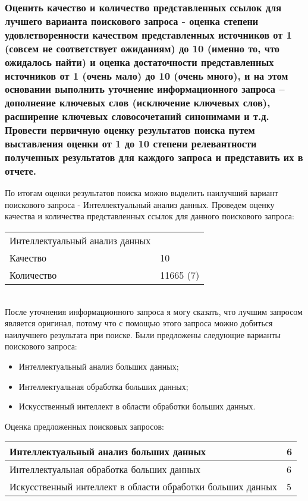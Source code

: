 \documentclass[14pt,a4paper,report]{report}
\begin{document}
\subsubsection{Оценить качество и количество представленных ссылок для лучшего варианта поискового запроса - оценка степени удовлетворенности качеством представленных источников от 1 (совсем не соответствует ожиданиям) до 10 (именно то, что ожидалось найти) и оценка достаточности представленных источников от 1 (очень мало) до 10 (очень много), и на этом основании выполнить уточнение информационного запроса – дополнение ключевых слов (исключение ключевых слов), расширение ключевых словосочетаний синонимами и т.д. Провести первичную оценку результатов поиска путем выставления оценки от 1 до 10 степени релевантности полученных результатов для каждого запроса и представить их в отчете.}

По итогам оценки результатов поиска можно выделить наилучший вариант поискового запроса - Интеллектуальный анализ данных.
Проведем оценку качества и количества представленных ссылок для данного поискового запроса:\\

\begin{tabular}{ l l }
Интеллектуальный анализ данных \\
Качество & 10 \\
Количество & 11665 (7) \\
\end{tabular}\\

После уточнения информационного запроса я могу сказать, что лучшим запросом является оригинал, потому что с помощью этого запроса можно добиться наилучшего результата при поиске.
Были предложены следующие варианты поискового запроса:
\begin{itemize}
	\item Интеллектуальный анализ больших данных;
	\item Интеллектуальная обработка больших данных;
	\item Искусственный интеллект в области обработки больших данных.
\end{itemize}

Оценка предложенных поисковых запросов:\\

\begin{tabular}{ | l | l | }
\hline
Интеллектуальный анализ больших данных & 6 \\ \hline
Интеллектуальная обработка больших данных & 6 \\ \hline
Искусственный интеллект в области обработки больших данных & 5 \\
\hline
\end{tabular}
\end{document}
